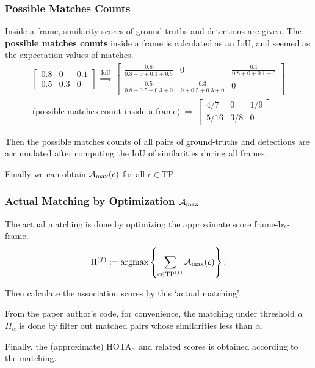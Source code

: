 \documentclass[slidetop, mathserif]{beamer}
\begin{document}

\begin{frame}
	\frametitle{Possible Matches Counts}

	Inside a frame, similarity scores of ground-truths and detections are given.
	The {\bf possible matches counts} inside a frame
	is calculated as an IoU, and seemed as the expectation values of matches.
	\begin{align*}
	\begin{bmatrix}	
	0.8                       & 0                       & 0.1                     \\
	0.5                       & 0.3                     & 0                       
	\end{bmatrix}
	\ \stackrel{\text{IoU}}{\Rightarrow}\ 
	\begin{bmatrix}
	\frac{0.8}{0.8+0+0.1+0.5} & 0                       & \frac{0.1}{0.8+0+0.1+0} \\
	\frac{0.5}{0.8+0.5+0.3+0} & \frac{0.3}{0+0.5+0.3+0} & 0                       
	\end{bmatrix} \\
	\text{(possible matches count inside a frame)}~ \Rightarrow ~ 
	\begin{bmatrix}
	4/7                       & 0                       & 1/9                     \\
	5/16                      & 3/8                     & 0                       
	\end{bmatrix}
	\end{align*}

	Then the possible matches counts of all pairs of ground-truths and detections
	are accumulated after computing the IoU of similarities during all frames.

	Finally we can obtain $\mathcal A_{\rm max}(c)$ for
	all $c\in\text{TP}$.

\end{frame}

\begin{frame}
	\frametitle{Actual Matching by Optimization $\mathcal A_{\rm max}$}

	The actual matching is done by
	optimizing the approximate score frame-by-frame.
	\[
		\Pi^{(f)} := 
		\text{argmax}\left\{ \sum\limits_{c\in\text{TP}^{(f)}} \mathcal A_{\rm max}(c) \right\}.
	\]

	Then calculate the association scores by this `actual matching'.

	\vspace{3pt}

	From the paper author's code, for convenience, 
	the matching under threshold $\alpha$ $\Pi_\alpha$ is done by
	filter out matched pairs whose similarities less than $\alpha$.

	\vspace{5pt}

	Finally, the (approximate) HOTA$_\alpha$ and related scores
	is obtained according to the matching.

\end{frame}
\end{document}
